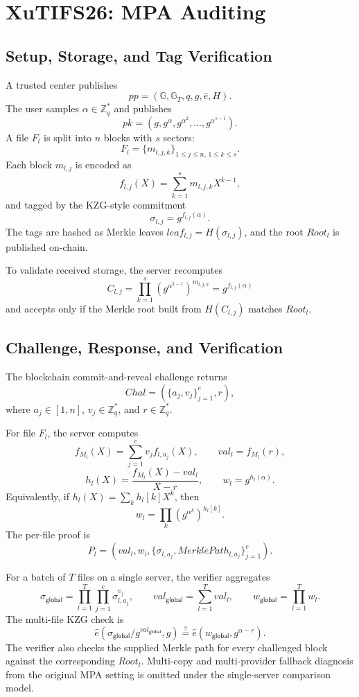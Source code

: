 \documentclass[11pt]{article}
\newcommand{\G}{\mathbb{G}}
\newcommand{\GT}{\mathbb{G}_T}
\newcommand{\Zq}{\mathbb{Z}_q}
\begin{document}
\section{XuTIFS26: MPA Auditing}

\subsection{Setup, Storage, and Tag Verification}

A trusted center publishes
\[
    pp=(\G,\GT,q,g,\hat e,H).
\]
The user samples \(\alpha\in\Zq^\ast\) and publishes
\[
    pk=(g,g^\alpha,g^{\alpha^2},\ldots,g^{\alpha^{s-1}}).
\]
A file \(F_l\) is split into \(n\) blocks with \(s\) sectors:
\[
    F_l=\{m_{l,j,k}\}_{1\le j\le n,\,1\le k\le s}.
\]
Each block \(m_{l,j}\) is encoded as
\[
    f_{l,j}(X)=\sum_{k=1}^{s}m_{l,j,k}X^{k-1},
\]
and tagged by the KZG-style commitment
\[
    \sigma_{l,j}=g^{f_{l,j}(\alpha)}.
\]
The tags are hashed as Merkle leaves \(leaf_{l,j}=H(\sigma_{l,j})\), and the
root \(Root_l\) is published on-chain.

To validate received storage, the server recomputes
\[
    C_{l,j}=\prod_{k=1}^{s}(g^{\alpha^{k-1}})^{m_{l,j,k}}
    =g^{f_{l,j}(\alpha)}
\]
and accepts only if the Merkle root built from \(H(C_{l,j})\) matches
\(Root_l\).

\subsection{Challenge, Response, and Verification}

The blockchain commit-and-reveal challenge returns
\[
    Chal=(\{a_j,v_j\}_{j=1}^{c},r),
\]
where \(a_j\in[1,n]\), \(v_j\in\Zq^\ast\), and \(r\in\Zq^\ast\).

For file \(F_l\), the server computes
\[
    f_{M_l}(X)=\sum_{j=1}^{c}v_j f_{l,a_j}(X),\qquad
    val_l=f_{M_l}(r),
\]
\[
    h_l(X)=\frac{f_{M_l}(X)-val_l}{X-r},\qquad
    w_l=g^{h_l(\alpha)}.
\]
Equivalently, if \(h_l(X)=\sum_k h_l[k]X^k\), then
\[
    w_l=\prod_k(g^{\alpha^k})^{h_l[k]}.
\]
The per-file proof is
\[
    P_l=(val_l,w_l,\{\sigma_{l,a_j},MerklePath_{l,a_j}\}_{j=1}^{c}).
\]

For a batch of \(T\) files on a single server, the verifier aggregates
\[
    \sigma_{\mathsf{global}}
    =\prod_{l=1}^{T}\prod_{j=1}^{c}\sigma_{l,a_j}^{v_j},
    \qquad
    val_{\mathsf{global}}=\sum_{l=1}^{T}val_l,
    \qquad
    w_{\mathsf{global}}=\prod_{l=1}^{T}w_l.
\]
The multi-file KZG check is
\[
    \hat e(\sigma_{\mathsf{global}}/g^{val_{\mathsf{global}}},g)
    \stackrel{?}{=}
    \hat e(w_{\mathsf{global}},g^{\alpha-r}).
\]
The verifier also checks the supplied Merkle path for every challenged block
against the corresponding \(Root_l\).  Multi-copy and multi-provider fallback
diagnosis from the original MPA setting is omitted under the single-server
comparison model.
\end{document}
